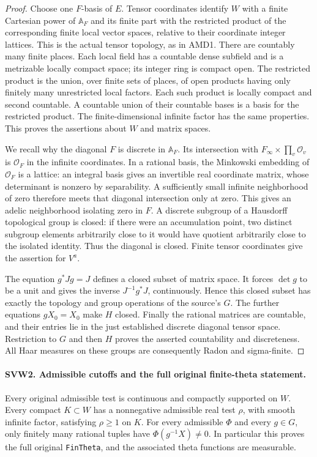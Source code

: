 \documentclass[11pt,a4paper]{article}
\numberwithin{equation}{section}
\theoremstyle{remark}\newtheorem{remark}[theorem]{Remark}
\begin{document}
\begin{proof}
Choose one $F$-basis of $E$.  Tensor coordinates identify $W$ with
a finite Cartesian power of $\mathbb A_F$ and its finite part with
the restricted product of the corresponding finite local vector
spaces, relative to their coordinate integer lattices.  This is the
actual tensor topology, as in AMD1.  There are countably many finite
places.  Each local field has a countable dense subfield and is a
metrizable locally compact space; its integer ring is compact open.
The restricted product is the union, over finite sets of places, of
open products having only finitely many unrestricted local factors.
Each such product is locally compact and second countable.  A
countable union of their countable bases is a basis for the restricted
product.  The finite-dimensional infinite factor has the same
properties.  This proves the assertions about $W$ and matrix spaces.

We recall why the diagonal $F$ is discrete in $\mathbb A_F$.  Its
intersection with $F_\infty\times\prod_v\mathcal O_v$ is
$\mathcal O_F$ in the infinite coordinates.  In a rational basis,
the Minkowski embedding of $\mathcal O_F$ is a lattice: an integral
basis gives an invertible real coordinate matrix, whose determinant
is nonzero by separability.  A sufficiently small infinite
neighborhood of zero therefore meets that diagonal intersection only
at zero.  This gives an adelic neighborhood isolating zero in $F$.
A discrete subgroup of a Hausdorff topological group is closed: if
there were an accumulation point, two distinct subgroup elements
arbitrarily close to it would have quotient arbitrarily close to
the isolated identity.  Thus the diagonal is closed.  Finite tensor
coordinates give the assertion for $V^a$.

The equation $g^*Jg=J$ defines a closed subset of matrix space.
It forces $\det g$ to be a unit and gives the inverse
$J^{-1}g^*J$, continuously.  Hence this closed subset has exactly
the topology and group operations of the source's $G$.  The further
equations $gX_0=X_0$ make $H$ closed.  Finally the rational matrices
are countable, and their entries lie in the just established
discrete diagonal tensor space.  Restriction to $G$ and then $H$
proves the asserted countability and discreteness.  All Haar
measures on these groups are consequently Radon and sigma-finite.
\end{proof}

\paragraph{SVW2. Admissible cutoffs and the full original finite-theta statement.}
\label{claim:SVW2}
Every original admissible test is continuous and compactly supported
on $W$.  Every compact $K\subset W$ has a nonnegative admissible
real test $\rho$, with smooth infinite factor, satisfying
$\rho\geq1$ on $K$.  For every admissible $\Phi$ and every $g\in G$,
only finitely many rational tuples have $\Phi(g^{-1}X)\ne0$.
In particular this proves the full original \texttt{Fin\allowbreak Theta}, and
the associated theta functions are measurable.
\end{document}
